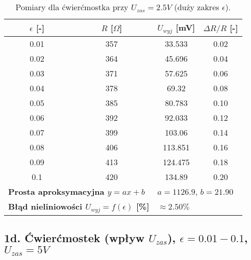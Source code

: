 \documentclass[12pt, a4paper]{article}
\begin{document}
	\begin{table}[H]
		\centering
		\caption{Pomiary dla ćwierćmostka przy $U_{zas} = 2.5 V$ (duży zakres $\epsilon$).}
		\begin{tabular}{cccc}
			\toprule
			$\epsilon$ [-] & $R$ [$\Omega$] & $U_{wyj}$ [mV] & $\Delta R/R$ [-] \\
			\midrule
			0.01 & 357 & 33.533 & 0.02 \\
			0.02 & 364 & 45.696 & 0.04 \\
			0.03 & 371 & 57.625 & 0.06 \\
			0.04 & 378 & 69.32 & 0.08 \\
			0.05 & 385 & 80.783 & 0.10 \\
			0.06 & 392 & 92.033 & 0.12 \\
			0.07 & 399 & 103.06 & 0.14 \\
			0.08 & 406 & 113.851 & 0.16 \\
			0.09 & 413 & 124.475 & 0.18 \\
			0.1 & 420 & 134.89 & 0.20 \\
			\midrule
			\multicolumn{2}{l}{\textbf{Prosta aproksymacyjna $y = ax + b$}} & \multicolumn{2}{l}{$a = 1126.9$, $b = 21.90$} \\
			\multicolumn{2}{l}{\textbf{Błąd nieliniowości $U_{wyj} = f(\epsilon)$ [\%]}} & \multicolumn{2}{l}{$\approx 2.50 \%$} \\
			\bottomrule
		\end{tabular}
	\end{table}
	
	\subsection{1d. Ćwierćmostek (wpływ $U_{zas}$), $\epsilon = 0.01-0.1$, $U_{zas} = 5 V$}
	
\end{document}
